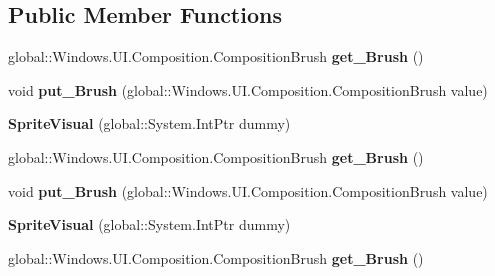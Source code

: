 \subsection*{Public Member Functions}
\begin{DoxyCompactItemize}
\item 
\mbox{\label{class_windows_1_1_u_i_1_1_composition_1_1_sprite_visual_a01923ba0550c97deee1067dcb9ec1eab}} 
global\+::\+Windows.\+U\+I.\+Composition.\+Composition\+Brush {\bfseries get\+\_\+\+Brush} ()
\item 
\mbox{\label{class_windows_1_1_u_i_1_1_composition_1_1_sprite_visual_aefd27cc06b2e04c7c8177472a8571679}} 
void {\bfseries put\+\_\+\+Brush} (global\+::\+Windows.\+U\+I.\+Composition.\+Composition\+Brush value)
\item 
\mbox{\label{class_windows_1_1_u_i_1_1_composition_1_1_sprite_visual_ac74110ddcbef435de17c2bfd5813f7ba}} 
{\bfseries Sprite\+Visual} (global\+::\+System.\+Int\+Ptr dummy)
\item 
\mbox{\label{class_windows_1_1_u_i_1_1_composition_1_1_sprite_visual_a01923ba0550c97deee1067dcb9ec1eab}} 
global\+::\+Windows.\+U\+I.\+Composition.\+Composition\+Brush {\bfseries get\+\_\+\+Brush} ()
\item 
\mbox{\label{class_windows_1_1_u_i_1_1_composition_1_1_sprite_visual_aefd27cc06b2e04c7c8177472a8571679}} 
void {\bfseries put\+\_\+\+Brush} (global\+::\+Windows.\+U\+I.\+Composition.\+Composition\+Brush value)
\item 
\mbox{\label{class_windows_1_1_u_i_1_1_composition_1_1_sprite_visual_ac74110ddcbef435de17c2bfd5813f7ba}} 
{\bfseries Sprite\+Visual} (global\+::\+System.\+Int\+Ptr dummy)
\item 
\mbox{\label{class_windows_1_1_u_i_1_1_composition_1_1_sprite_visual_a01923ba0550c97deee1067dcb9ec1eab}} 
global\+::\+Windows.\+U\+I.\+Composition.\+Composition\+Brush {\bfseries get\+\_\+\+Brush} ()

\end{DoxyCompactItemize}
